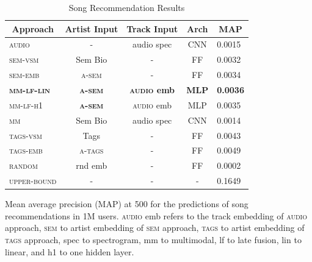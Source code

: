 \begin{table}[]
\begin{threeparttable}
\centering
\caption{Song Recommendation Results}
\label{tbl:song}
\begin{tabular}{lcccl}
\multicolumn{1}{c}{\textbf{Approach}} & \textbf{Artist Input} & \textbf{Track Input} & \textbf{Arch} & \multicolumn{1}{c}{\textbf{MAP}} \\
\toprule
\textsc{audio}                                 & -                     & audio spec        & CNN           & 0.0015                          \\
\textsc{sem-vsm}                               & Sem Bio               & -                    & FF            & 0.0032                          \\
\textsc{sem-emb}                               & \textsc{a-sem}            & -                    & FF            & 0.0034                          \\
\midrule
\textsc{\textbf{mm-lf-lin}}                        & \textsc{\textbf{a-sem}}     & \textbf{\textsc{audio} emb}  & \textbf{MLP} & \textbf{0.0036}                  \\
\textsc{mm-lf-h1}                        & \textsc{\textbf{a-sem}}     & \textsc{audio} emb  & MLP & 0.0035                  \\
\textsc{mm}                                    & Sem Bio               & audio spec        & CNN            & 0.0014                          \\
\midrule
\textsc{tags-vsm}                              & Tags              & -                    & FF            & 0.0043                          \\
\textsc{tags-emb}                              & \textsc{a-tags}           & -                    & FF            & 0.0049                          \\
\midrule
\textsc{random}                                & rnd emb         & -                    & FF            & 0.0002                          \\
\textsc{upper-bound}                           & -                     & -                    & -             & 0.1649                   \\      
\bottomrule
\end{tabular}
\begin{tablenotes}
      \small
      \item Mean average precision (MAP) at 500 for the predictions of song recommendations in 1M users. \textsc{audio} emb refers to the track embedding of \textsc{audio} approach, \textsc{sem} to artist embedding of \textsc{sem} approach, \textsc{tags} to artist embedding of \textsc{tags} approach, spec to spectrogram, mm to multimodal, lf to late fusion, lin to linear, and h1 to one hidden layer.
    \end{tablenotes}
   \end{threeparttable}
\end{table}

